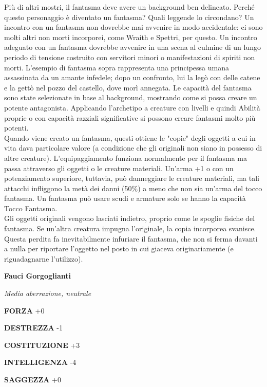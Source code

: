 \begin{multicols}{2}
Più di altri mostri, il fantasma deve avere un background ben delineato. Perché questo personaggio è diventato un fantasma? Quali leggende lo circondano? Un incontro con un fantasma non dovrebbe mai avvenire in modo accidentale: ci sono molti altri non morti incorporei, come Wraith e Spettri, per questo. Un incontro adeguato con un fantasma dovrebbe avvenire in una scena al culmine di un lungo periodo di tensione costruito con servitori minori o manifestazioni di spiriti non morti. L'esempio di fantasma sopra rappresenta una principessa umana assassinata da un amante infedele; dopo un confronto, lui la legò con delle catene e la gettò nel pozzo del castello, dove morì annegata. Le capacità del fantasma sono state selezionate in base al background, mostrando come si possa creare un potente antagonista. Applicando l'archetipo a creature con livelli e quindi Abilità proprie o con capacità razziali significative si possono creare fantasmi molto più potenti.\\

Quando viene creato un fantasma, questi ottiene le "copie" degli oggetti a cui in vita dava particolare valore (a condizione che gli originali non siano in possesso di altre creature). L'equipaggiamento funziona normalmente per il fantasma ma passa attraverso gli oggetti o le creature materiali. Un'arma +1 o con un potenziamento superiore, tuttavia, può danneggiare le creature materiali, ma tali attacchi infliggono la metà dei danni (50\%) a meno che non sia un'arma del tocco fantasma. Un fantasma può usare scudi e armature solo se hanno la capacità Tocco Fantasma.\\

Gli oggetti originali vengono lasciati indietro, proprio come le spoglie fisiche del fantasma. Se un'altra creatura impugna l'originale, la copia incorporea svanisce. Questa perdita fa inevitabilmente infuriare il fantasma, che non si ferma davanti a nulla per riportare l'oggetto nel posto in cui giaceva originariamente (e riguadagnarne l'utilizzo).


\medskip{}\textbf{Fauci Gorgoglianti}

\textit{Media aberrazione, neutrale}

\textbf{FORZA} +0

\textbf{DESTREZZA} -1

\textbf{COSTITUZIONE} +3

\textbf{INTELLIGENZA} -4

\textbf{SAGGEZZA} +0


\end{multicols}
